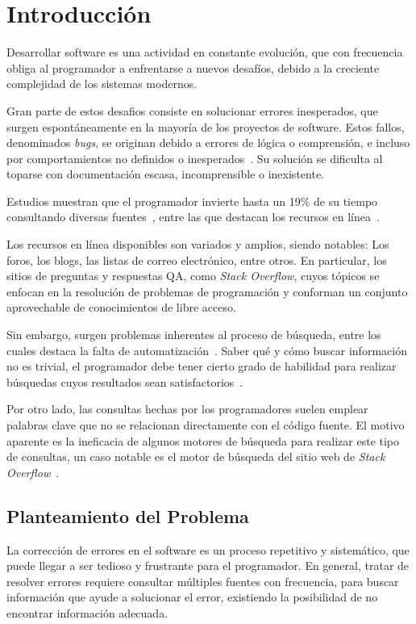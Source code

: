 \chapter*{Introducción}

Desarrollar software es una actividad en constante evolución,
que con frecuencia obliga al programador a enfrentarse a nuevos desafíos,
debido a la creciente complejidad de los sistemas modernos.

Gran parte de estos desafios consiste en solucionar errores inesperados,
que surgen espontáneamente en la mayoría de los proyectos de software.
Estos fallos, denominados \textit{bugs}, se originan debido a errores de lógica o comprensión,
e incluso por comportamientos no definidos o inesperados~\cite{monperrus:hal-00987395}.
Su solución se dificulta al toparse con documentación escasa, incomprensible o inexistente.

Estudios muestran que el programador invierte hasta un 19\% de su tiempo~\cite{Brandt:2009:TSO:1518701.1518944}
consultando diversas fuentes~\cite{Ko:2007:INC:1248820.1248867},
entre las que destacan los recursos en línea~\cite{10.1007/978-0-387-09684-1_21}.

Los recursos en línea disponibles son variados y amplios,
siendo notables: Los foros, los blogs, las listas de correo electrónico, entre otros.
En particular, los sitios de preguntas y respuestas \ac{QA},
como \textit{Stack Overflow}, cuyos tópicos se enfocan en 
la resolución de problemas de programación
y conforman un conjunto aprovechable de conocimientos de libre acceso.

Sin embargo, surgen problemas inherentes al proceso de búsqueda,
entre los cuales destaca la falta de automatización~\cite{Ponzanelli:2014:PSR:2705615.2706035}.
Saber qué y cómo buscar información no es trivial,
el programador debe tener cierto grado de habilidad para realizar
búsquedas cuyos resultados sean satisfactorios~\cite{Stolee:2014:SSS:2628068.2581377}.

Por otro lado, las consultas hechas por los programadores
suelen emplear palabras clave que no se relacionan directamente con el código fuente.
El motivo aparente es la ineficacia de algunos motores de búsqueda para realizar este tipo de consultas,
un caso notable es el motor de búsqueda del sitio web de \textit{Stack Overflow}~\cite{monperrus:hal-00987395}.

\section*{Planteamiento del Problema}
La corrección de errores en el software es un proceso repetitivo y sistemático,
que puede llegar a ser tedioso y frustrante para el programador.
En general, tratar de resolver errores requiere consultar múltiples fuentes con frecuencia,
para buscar información que ayude a solucionar el error,
existiendo la posibilidad de no encontrar información adecuada.

